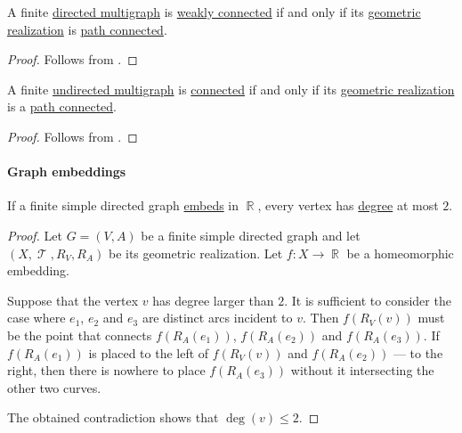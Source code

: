 \begin{corollary}\label{thm:directed_multigraph_geometric_realization_connectedness}
  A finite \hyperref[def:directed_multigraph]{directed multigraph} is \hyperref[def:graph_connectedness/weak]{weakly connected} if and only if its \hyperref[def:graph_geometric_realization/undirected]{geometric realization} is \hyperref[def:path_connected_space]{path connected}.
\end{corollary}
\begin{proof}
  Follows from .
\end{proof}

\begin{corollary}\label{thm:undirected_multigraph_geometric_realization_connectedness}
  A finite \hyperref[def:undirected_multigraph]{undirected multigraph} is \hyperref[def:graph_connectedness/undirected]{connected} if and only if its \hyperref[def:graph_geometric_realization/undirected]{geometric realization} is a \hyperref[def:path_connected_space]{path connected}.
\end{corollary}
\begin{proof}
  Follows from .
\end{proof}

\paragraph{Graph embeddings}

\begin{proposition}\label{thm:linear_directed multigraph_equivalence}
  If a finite simple directed graph \hyperref[def:graph_geometric_realization/embedding]{embeds} in \( \BbbR \), every vertex has \hyperref[def:graph_cardinality/directed_degree]{degree} at most \( 2 \).
\end{proposition}
\begin{proof}
  Let \( G = (V, A) \) be a finite simple directed graph and let \( (X, \mscrT, R_V, R_A) \) be its geometric realization. Let \( f: X \to \BbbR \) be a homeomorphic embedding.

  Suppose that the vertex \( v \) has degree larger than \( 2 \). It is sufficient to consider the case where \( e_1 \), \( e_2 \) and \( e_3 \) are distinct arcs incident to \( v \). Then \( f(R_V(v)) \) must be the point that connects \( f(R_A(e_1)) \), \( f(R_A(e_2)) \) and \( f(R_A(e_3)) \). If \( f(R_A(e_1)) \) is placed to the left of \( f(R_V(v)) \) and \( f(R_A(e_2)) \) --- to the right, then there is nowhere to place \( f(R_A(e_3)) \) without it intersecting the other two curves.

  The obtained contradiction shows that \( \deg(v) \leq 2 \).
\end{proof}

